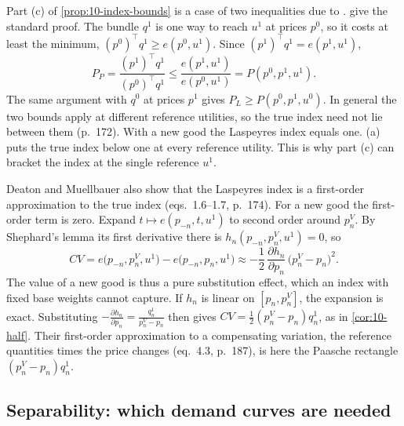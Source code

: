 \begin{remark}\label{rem:10-konus}
Part (c) of \cref{prop:10-index-bounds} is a case of two inequalities due to \citet{Konus1939}.
\citet[Section~7.1, eqs.~1.3--1.4, p.~172]{DeatonMuellbauer1980b} give the standard proof. The bundle $q^1$ is one
way to reach $u^1$ at prices $p^0$, so it costs at least the minimum, $(p^0)^\top q^1 \ge e(p^0,u^1)$. Since
$(p^1)^\top q^1 = e(p^1,u^1)$,
\begin{equation*}
  P_P = \frac{(p^1)^\top q^1}{(p^0)^\top q^1} \le \frac{e(p^1,u^1)}{e(p^0,u^1)} = P(p^0,p^1,u^1).
\end{equation*}
The same argument with $q^0$ at prices $p^1$ gives $P_L \ge P(p^0,p^1,u^0)$. In general the two bounds apply at
different reference utilities, so the true index need not lie between them (p.~172). With a new good the
Laspeyres index equals one. (a) puts the true index below one at every reference utility.
This is why part (c) can bracket the index at the single reference $u^1$.

Deaton and Muellbauer also show that the Laspeyres index is a first-order approximation to the true index
(eqs.~1.6--1.7, p.~174). For a new good the first-order term is zero. Expand $t \mapsto e(p_{-n},t,u^1)$ to second
order around $p_n^V$. By Shephard's lemma its first derivative there is $h_n(p_{-n},p_n^V,u^1) = 0$, so
\begin{equation*}
  CV = e\bigl(p_{-n},p_n^V,u^1\bigr) - e\bigl(p_{-n},p_n,u^1\bigr)
  \approx -\frac{1}{2}\,\frac{\partial h_n}{\partial p_n}\,\bigl(p_n^V - p_n\bigr)^2 .
\end{equation*}
The value of a new good is thus a pure substitution effect, which an index with fixed base weights cannot capture.
If $h_n$ is linear on $[p_n,p_n^V]$, the expansion is exact. Substituting
$-\frac{\partial h_n}{\partial p_n} = \frac{q_n^1}{p_n^V - p_n}$ then gives $CV = \frac{1}{2}(p_n^V - p_n)q_n^1$, as
in \cref{cor:10-half}. Their first-order approximation to a compensating variation, the reference quantities times
the price changes (eq.~4.3, p.~187), is here the Paasche rectangle $(p_n^V - p_n)q_n^1$.
\end{remark}

\subsection{Separability: which demand curves are needed}\label{sec:10-separability}

